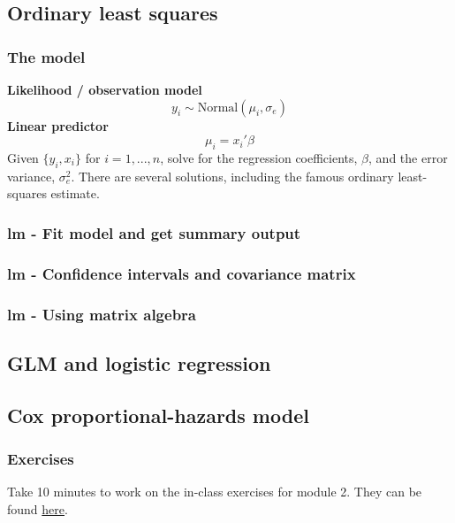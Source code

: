 \documentclass{beamer}
\begin{document}

\subsection{Ordinary least squares}

\begin{frame}
    \frametitle{The model}
    \textbf{Likelihood / observation model}
    \[y_i \sim \text{Normal}(\mu_i, \sigma_e)\]
    \textbf{Linear predictor}
    \[\mu_i = x_i' \beta\]
    \bigskip
    Given $\{y_i, x_i\}$ for $i=1,...,n$, solve for the regression coefficients, $\beta$,
    and the error variance, $\sigma_e^2$.
    \bigskip
    There are several solutions, including the famous ordinary least-squares estimate.
\end{frame}


\begin{frame}[fragile]
    \frametitle{lm - Fit model and get summary output}
    \fontsize{8}{10}\selectfont
    
\end{frame}


\begin{frame}[fragile]
    \frametitle{lm - Confidence intervals and covariance matrix}
    \fontsize{9}{11}\selectfont
    
\end{frame}


\begin{frame}[fragile]
    \frametitle{lm - Using matrix algebra}
    \fontsize{9}{11}\selectfont
    
\end{frame}





\subsection{GLM and logistic regression}


\subsection{Cox proportional-hazards model}



\begin{frame}%
    \frametitle{Exercises}
    Take 10 minutes to work on the in-class exercises for module 2.
    They can be found \href{https://github.com/rnitulescu/RcourseOncology2020/blob/master/exercises2.R}{here}.
\end{frame}
\end{document}
